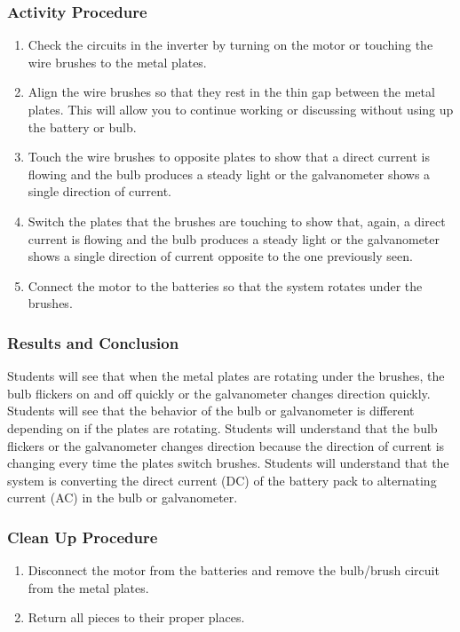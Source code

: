 \subsubsection*{Activity Procedure}
\begin{enumerate}
\item{Check the circuits in the inverter by turning on the motor or touching the wire brushes to the metal plates.} 
\item{Align the wire brushes so that they rest in the thin gap between the metal plates. This will allow you to continue working or discussing without using up the battery or bulb.} 
\item{Touch the wire brushes to opposite plates to show that a direct current is flowing and the bulb produces a steady light or the galvanometer shows a single direction of current.} 
\item{Switch the plates that the brushes are touching to show that, again, a direct current is flowing and the bulb produces a steady light or the galvanometer shows a single direction of current opposite to the one previously seen.} 
\item{Connect the motor to the batteries so that the system rotates under the brushes.} 
\end{enumerate}

\subsubsection*{Results and Conclusion}
Students will see that when the metal plates are rotating under the brushes, the bulb flickers on and off quickly or the galvanometer changes direction quickly.  
Students will see that the behavior of the bulb or galvanometer is different depending on if the plates are rotating.  
Students will understand that the bulb flickers or the galvanometer changes direction because the direction of current is changing every time the plates switch brushes.  
Students will understand that the system is converting the direct current (DC) of the battery pack to alternating current (AC) in the bulb or galvanometer.  

\subsubsection*{Clean Up Procedure}
\begin{enumerate}
\item{Disconnect the motor from the batteries and remove the bulb/brush circuit from the metal plates.} 
\item{Return all pieces to their proper places.} 
\end{enumerate}


